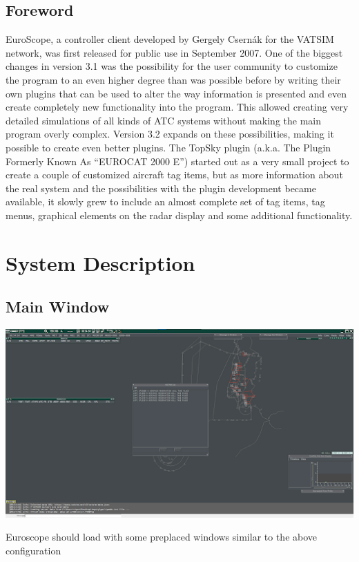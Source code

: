 \documentclass[11pt,a4paper,oldfontcommands]{memoir}
\begin{document}
\section{Foreword}
EuroScope, a controller client developed by Gergely Csernák for the VATSIM network, was first released for public use in September 2007. One of the biggest changes in version 3.1 was the possibility for the user community to customize the program to an even higher degree than was possible before by writing their own plugins that can be used to alter the way information is presented and even create completely new functionality into the program. This allowed creating very detailed simulations of all kinds of ATC systems without making the main program overly complex. Version 3.2 expands on these possibilities, making it possible to create even better plugins.
The TopSky plugin (a.k.a. The Plugin Formerly Known As “EUROCAT 2000 E”) started out as a very small project to create a couple of customized aircraft tag items, but as more information about the real system and the possibilities with the plugin development became available, it slowly grew to include an almost complete set of tag items, tag menus, graphical elements on the radar display and some additional functionality.

\chapter{System Description}
\section{Main Window}
\includegraphics[width=15cm, keepaspectratio]{img/mainwindow.png}

Euroscope should load with some preplaced windows similar to the above configuration
\medskip
\end{document}
